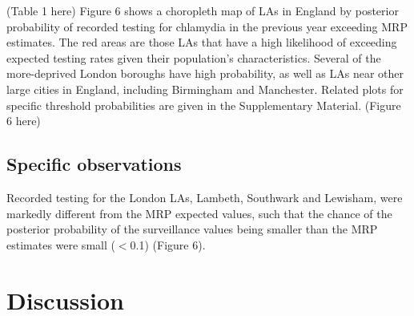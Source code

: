 \documentclass[fleqn,10pt]{wlscirep}
\begin{document}
 (Table 1 here)
Figure 6 shows a choropleth map of LAs in England by posterior probability of recorded testing for chlamydia in the previous year exceeding MRP estimates. The red areas are those LAs that have a high likelihood of exceeding expected testing rates given their population’s characteristics. Several of the more-deprived London boroughs have high probability, as well as LAs near other large cities in England, including Birmingham and Manchester. Related plots for specific threshold probabilities are given in the Supplementary Material.
(Figure 6 here)

\subsection*{Specific observations}
Recorded testing for the London LAs, Lambeth, Southwark and Lewisham, were markedly different from the MRP expected values, such that the chance of the posterior probability of the surveillance values being smaller than the MRP estimates were small ($<$0.1) (Figure 6).

\section*{Discussion}
\end{document}
